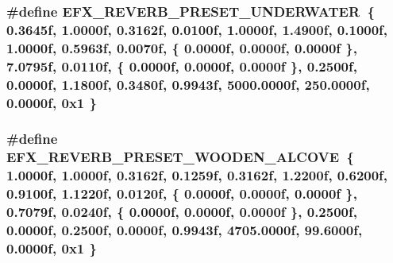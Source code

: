\subsubsection[{\texorpdfstring{E\+F\+X\+\_\+\+R\+E\+V\+E\+R\+B\+\_\+\+P\+R\+E\+S\+E\+T\+\_\+\+U\+N\+D\+E\+R\+W\+A\+T\+ER}{EFX_REVERB_PRESET_UNDERWATER}}]{\setlength{\rightskip}{0pt plus 5cm}\#define E\+F\+X\+\_\+\+R\+E\+V\+E\+R\+B\+\_\+\+P\+R\+E\+S\+E\+T\+\_\+\+U\+N\+D\+E\+R\+W\+A\+T\+ER~\{ 0.\+3645f, 1.\+0000f, 0.\+3162f, 0.\+0100f, 1.\+0000f, 1.\+4900f, 0.\+1000f, 1.\+0000f, 0.\+5963f, 0.\+0070f, \{ 0.\+0000f, 0.\+0000f, 0.\+0000f \}, 7.\+0795f, 0.\+0110f, \{ 0.\+0000f, 0.\+0000f, 0.\+0000f \}, 0.\+2500f, 0.\+0000f, 1.\+1800f, 0.\+3480f, 0.\+9943f, 5000.\+0000f, 250.\+0000f, 0.\+0000f, 0x1 \}}\hypertarget{efx-presets_8h_a507d85d1c0b55bb3ba82360f48e50506}{}\label{efx-presets_8h_a507d85d1c0b55bb3ba82360f48e50506}
\subsubsection[{\texorpdfstring{E\+F\+X\+\_\+\+R\+E\+V\+E\+R\+B\+\_\+\+P\+R\+E\+S\+E\+T\+\_\+\+W\+O\+O\+D\+E\+N\+\_\+\+A\+L\+C\+O\+VE}{EFX_REVERB_PRESET_WOODEN_ALCOVE}}]{\setlength{\rightskip}{0pt plus 5cm}\#define E\+F\+X\+\_\+\+R\+E\+V\+E\+R\+B\+\_\+\+P\+R\+E\+S\+E\+T\+\_\+\+W\+O\+O\+D\+E\+N\+\_\+\+A\+L\+C\+O\+VE~\{ 1.\+0000f, 1.\+0000f, 0.\+3162f, 0.\+1259f, 0.\+3162f, 1.\+2200f, 0.\+6200f, 0.\+9100f, 1.\+1220f, 0.\+0120f, \{ 0.\+0000f, 0.\+0000f, 0.\+0000f \}, 0.\+7079f, 0.\+0240f, \{ 0.\+0000f, 0.\+0000f, 0.\+0000f \}, 0.\+2500f, 0.\+0000f, 0.\+2500f, 0.\+0000f, 0.\+9943f, 4705.\+0000f, 99.\+6000f, 0.\+0000f, 0x1 \}}\hypertarget{efx-presets_8h_ab06028b7c454c3e43cc4caac83c461ac}{}\label{efx-presets_8h_ab06028b7c454c3e43cc4caac83c461ac}
